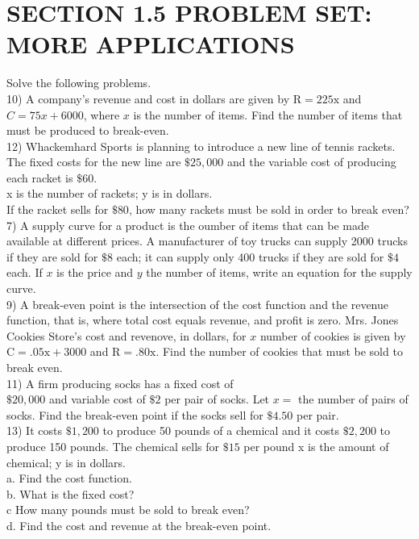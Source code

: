 \section*{SECTION 1.5 PROBLEM SET: MORE APPLICATIONS}
Solve the following problems.\\
10) A company's revenue and cost in dollars are given by $\mathrm{R}=225 \mathrm{x}$ and $C=75 x+6000$, where $x$ is the number of items. Find the number of items that must be produced to break-even.\\
12) Whackemhard Sports is planning to introduce a new line of tennis rackets. The fixed costs for the new line are $\$ 25,000$ and the variable cost of producing each racket is $\$ 60$.\\
x is the number of rackets; y is in dollars.\\
If the racket sells for $\$ 80$, how many rackets must be sold in order to break even?\\
7) A supply curve for a product is the oumber of items that can be made available at different prices. A manufacturer of toy trucks can supply 2000 trucks if they are sold for $\$ 8$ each; it can supply only 400 trucks if they are sold for $\$ 4$ each. If $x$ is the price and $y$ the number of items, write an equation for the supply curve.\\
9) A break-even point is the intersection of the cost function and the revenue function, that is, where total cost equals revenue, and profit is zero. Mrs. Jones Cookies Store's cost and revenove, in dollars, for $x$ number of cookies is given by $\mathrm{C}=.05 \mathrm{x}+3000$ and $\mathrm{R}=.80 \mathrm{x}$. Find the number of cookies that must be sold to break even.\\
11) A firm producing socks has a fixed cost of\\
$\$ 20,000$ and variable cost of $\$ 2$ per pair of socks. Let $x=$ the number of pairs of socks. Find the break-even point if the socks sell for $\$ 4.50$ per pair.\\
13) It costs $\$ 1,200$ to produce 50 pounds of a chemical and it costs $\$ 2,200$ to produce 150 pounds. The chemical sells for $\$ 15$ per pound x is the amount of chemical; y is in dollars.\\
a. Find the cost function.\\
b. What is the fixed cost?\\
c How many pounds must be sold to break even?\\
d. Find the cost and revenue at the break-even point.

